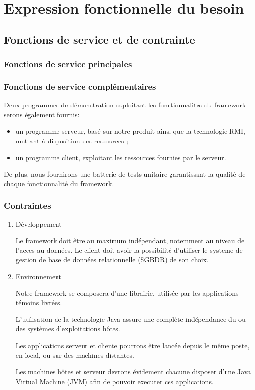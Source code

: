 \section{Expression fonctionnelle du besoin}

\subsection{Fonctions de service et de contrainte}
\subsubsection{Fonctions de service principales}

\subsubsection{Fonctions de service complémentaires}
Deux programmes de démonstration exploitant les fonctionnalités du framework serons également
fournis:
\begin{itemize}
 \item un programme serveur, basé sur notre produit ainsi que la technologie RMI, mettant à disposition des ressources ;
 \item un programme client, exploitant les ressources fournies par le serveur. 
\end{itemize}

De plus, nous fournirons une batterie de tests unitaire garantissant la qualité de chaque fonctionnalité du framework.
\subsubsection{Contraintes}
\begin{enumerate}
 \item Développement

Le framework doit être au maximum indépendant, notemment au niveau de l'acces au données.
Le client doit avoir la possibilité d'utiliser le systeme de gestion de base de données relationnelle (SGBDR) de son choix.

 \item Environnement

Notre framework se composera d'une librairie, utilisée par les applications témoins livrées.

L'utilisation de la technologie Java assure une complète indépendance du ou des systèmes d'exploitations hôtes.

Les applications serveur et cliente pourrons être lancée depuis le même poste, en local, ou sur des machines distantes.

Les machines hôtes et serveur devrons évidement chacune disposer d'une Java Virtual Machine (JVM) afin de pouvoir executer ces applications.

\end{enumerate}

